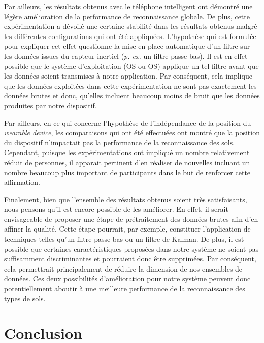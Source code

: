 Par ailleurs, les résultats obtenus avec le téléphone intelligent ont démontré une légère amélioration de la performance de reconnaissance globale. De plus, cette expérimentation a dévoilé une certaine stabilité dans les résultats obtenus malgré les différentes configurations qui ont été appliquées. L'hypothèse qui est formulée pour expliquer cet effet questionne la mise en place automatique d'un filtre sur les données issues du capteur inertiel (\textit{p. ex.} un filtre passe-bas). Il est en effet possible que le système d'exploitation (\acl{OS} ou \acs{OS}) applique un tel filtre avant que les données soient transmises à notre application. Par conséquent, cela implique que les données exploitées dans cette expérimentation ne sont pas exactement les données brutes et donc, qu'elles incluent beaucoup moins de bruit que les données produites par notre dispositif.

Par ailleurs, en ce qui concerne l'hypothèse de l'indépendance de la position du \textit{wearable device}, les comparaisons qui ont été effectuées ont montré que la position du dispositif n'impactait pas la performance de la reconnaissance des sols. Cependant, puisque les expérimentations ont impliqué un nombre relativement réduit de personnes, il apparait pertinent d'en réaliser de nouvelles incluant un nombre beaucoup plus important de participants dans le but de renforcer cette affirmation.

Finalement, bien que l'ensemble des résultats obtenus soient très satisfaisants, nous pensons qu'il est encore possible de les améliorer. En effet, il serait envisageable de proposer une étape de prétraitement des données brutes afin d'en affiner la qualité. Cette étape pourrait, par exemple, constituer l'application de techniques telles qu'un filtre passe-bas ou un filtre de Kalman. De plus, il est possible que certaines caractéristiques proposées dans notre système ne soient pas suffisamment discriminantes et pourraient donc être supprimées. Par conséquent, cela permettrait principalement de réduire la dimension de nos ensembles de données. Ces deux possibilités d'amélioration pour notre système peuvent donc potentiellement aboutir à une meilleure performance de la reconnaissance des types de sols.

\section{Conclusion}

